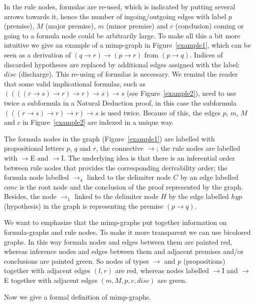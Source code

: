 \documentclass[submission,copyright,creativecommons]{eptcs}
\begin{document}
In the rule nodes, formulas are re-used, which is indicated by putting
several arrows towards it, hence the number of ingoing/outgoing edges with
label $p$ (premise), $M$ (major premise), $m$ (minor premise) and $c$
(conclusion) coming or going to a formula node could be arbitrarily large.
To make all this a bit more intuitive we give an example of a mimp-graph in
Figure~\ref{example1}, which can be seen as a derivation of $(q\rightarrow
r)\rightarrow (p\rightarrow r)$ from $(p\rightarrow q)$. Indices of
discarded hypotheses are replaced by additional edges assigned with the
label: $disc$ (discharge). This re-using of formulas is necessary. We remind
the reader that some valid implicational formulas, such as $((((r \to s) \to r) \to r) \to s) \to s$ (see Figure~\ref{example2}), 
need to use twice a subformula in a  Natural Deduction proof, in this case the subformula
$(((r \to s) \to r) \to r) \to s $ is used twice. Because of this, the edges $p$, $m$, $M$ and $c$ 
in Figure~\ref{example2} are indexed in a unique way.


The formula nodes in the graph (Figure~\ref{example1}) are labelled with
propositional letters $p$, $q$ and $r$, the connective $\rightarrow $; the
rule nodes are labelled with $\rightarrow$E and $\rightarrow$I. The
underlying idea is that there is an inferential order between rule nodes
that provides the corresponding derivability order; the formula node
labelled $\rightarrow _{4}$ linked to the delimiter node $C$ by an edge
labelled $conc$ is the root node and the conclusion of the proof represented
by the graph. Besides, the node $\rightarrow _{1}$ linked to the delimiter
node $H$ by the edge labelled $hyp$ (hypothesis) in the graph is
representing the premise $(p\rightarrow q)$.

We want to emphasize that the mimp-graphs put together information on
formula-graphs and rule nodes. To make it more transparent we can use
bicolored graphs. In this way formula nodes and edges between them are
painted red, whereas inference nodes and edges between them and adjacent
premises and/or conclusions are painted green. So nodes of types $\to$ and $p $ (propositions) together with adjacent edges $(l, r)$ are red, whereas
nodes labelled $\to$I and $\to$E together with adjacent edges $(m, M, p, c,
disc)$ are green. 

Now we give a formal definition of mimp-graphs.
\end{document}
